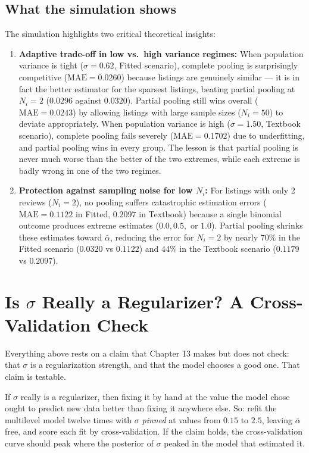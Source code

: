 \documentclass[11pt,a4paper]{article}
\begin{document}
\subsection{What the simulation shows}

The simulation highlights two critical theoretical insights:
\begin{enumerate}
  \item \textbf{Adaptive trade-off in low vs.\ high variance regimes:} When population variance is tight ($\sigma = 0.62$, Fitted scenario), complete pooling is surprisingly competitive ($\text{MAE} = 0.0260$) because listings are genuinely similar --- it is in fact the better estimator for the sparsest listings, beating partial pooling at $N_i = 2$ ($0.0296$ against $0.0320$). Partial pooling still wins overall ($\text{MAE} = 0.0243$) by allowing listings with large sample sizes ($N_i=50$) to deviate appropriately. When population variance is high ($\sigma = 1.50$, Textbook scenario), complete pooling fails severely ($\text{MAE} = 0.1702$) due to underfitting, and partial pooling wins in every group. The lesson is that partial pooling is never much worse than the better of the two extremes, while each extreme is badly wrong in one of the two regimes.
  \item \textbf{Protection against sampling noise for low $N_i$:} For listings with only 2 reviews ($N_i = 2$), no pooling suffers catastrophic estimation errors ($\text{MAE} = 0.1122$ in Fitted, $0.2097$ in Textbook) because a single binomial outcome produces extreme estimates ($0.0, 0.5,$ or $1.0$). Partial pooling shrinks these estimates toward $\bar\alpha$, reducing the error for $N_i=2$ by nearly $70\%$ in the Fitted scenario ($0.0320$ vs $0.1122$) and $44\%$ in the Textbook scenario ($0.1179$ vs $0.2097$).
\end{enumerate}

\section{Is $\sigma$ Really a Regularizer? A Cross-Validation Check}

Everything above rests on a claim that Chapter 13 makes but does not check: that
$\sigma$ is a regularization strength, and that the model chooses a good one.
That claim is testable.

If $\sigma$ really is a regularizer, then fixing it by hand at the value the
model chose ought to predict new data better than fixing it anywhere else. So:
refit the multilevel model twelve times with $\sigma$ \emph{pinned} at values
from $0.15$ to $2.5$, leaving $\bar\alpha$ free, and score each fit by
cross-validation. If the claim holds, the cross-validation curve should peak
where the posterior of $\sigma$ peaked in the model that estimated it.
\end{document}
